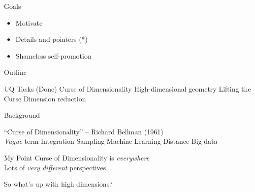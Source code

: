 \documentclass[14pt]{beamer}
\begin{document}
\begin{frame}{Goals}
  \begin{itemize}
  \item Motivate
  \item Details and pointers (*)
  \item Shameless self-promotion
  \end{itemize}
\end{frame}

\begin{frame}{Outline}
  \begin{outline}
  \1 UQ Tasks (Done)
  \1 Curse of Dimensionality
    \2 High-dimensional geometry
  \1 Lifting the Curse
    \2 Dimension reduction
  \end{outline}
\end{frame}

\begin{frame}{Background}
  \begin{outline}
  \1 ``Curse of Dimensionality'' -- Richard Bellman (1961) \\
  \1 \emph{Vague} term
    \2 Integration
    \2 Sampling
    \2 Machine Learning
    \2 Distance
    \2 Big data
  \end{outline}
\end{frame}


\begin{frame}{My Point}
  Curse of Dimensionality is \emph{everywhere} \\
  Lots of \emph{very different} perspectives

  \bigskip
  So what's up with high dimensions?
\end{frame}

\end{document}
